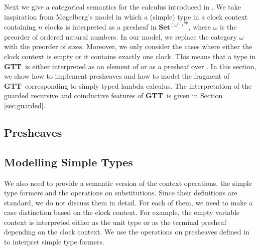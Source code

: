 \documentclass[a4paper,UKenglish,cleveref, autoref,numberwithinsect]{lipics-v2019}
\newcommand{\AD}[1]{\AgdaDatatype{#1}}
\newcommand{\IC}{\AgdaInductiveConstructor}
\newcommand{\F}{\AgdaFunction}
\newcommand{\GTT}{\textbf{GTT}}
\newcommand{\Set}{\mathbf{Set}}
\begin{document}
Next we give a categorical semantics for the calculus introduced in
.  We take inspiration from M{\o}gelberg's model
\cite{Mogelberg14} in which a (simple) type in a clock context
containing $n$ clocks is interpreted
as a presheaf in $\Set^{(\omega^n)^{\text{op}}}$, where $\omega$ is
the preorder of ordered natural numbers. In our model, we replace the
category $\omega$ with the preorder of sizes. Moreover, we only
consider the cases where either the clock context is empty or it
contains exactly one clock. This means that a type in \GTT\ is either
interpreted as an element of \F{Set} or as a presheaf over \F{Size}. 
In this section, we show how to implement presheaves and how to model
the fragment of \GTT\ corresponding to simply typed lambda
calculus. The interpretation of the guarded recursive and coinductive
features of \GTT\ is given in Section \ref{sec:guarded}.

\label{sec:presheaf_sem}
\subsection{Presheaves}
\label{sec:presheaves}







\subsection{Modelling Simple Types}
\label{sec:kripke}






We also need to provide a semantic version of 
the context operations, the simple type formers and the operations on substitutions.
Since their definitions are standard, we do not discuss them in detail.
For each of them, we need to make a case distinction based on the clock context.
For example, the empty variable context \IC{•} is interpreted either as the unit type
or as the terminal presheaf depending on the clock context.
We use the operations on presheaves defined in  to interpret simple type formers.

\end{document}
